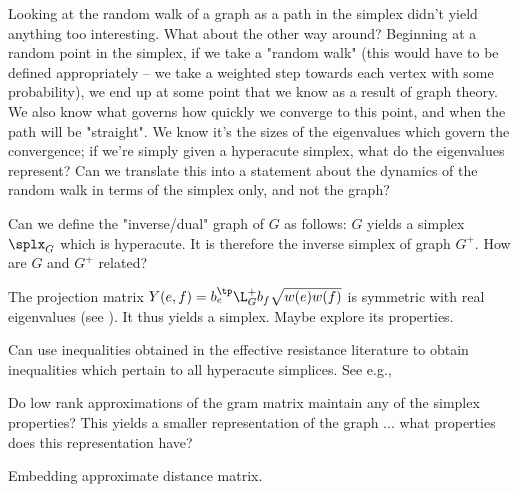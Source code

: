 	\item Looking at the random walk of a graph as a path in the simplex didn't yield anything too interesting. What about the other way around? Beginning at a random point in the simplex, if we take a "random walk" (this would have to be defined appropriately -- we take a weighted step towards each vertex with some probability), we end up at some point that we know as a result of graph theory. We also know what governs how quickly we converge to this point, and when the path will be "straight". We know it's the sizes of the eigenvalues which govern the convergence; if we're simply given a hyperacute simplex, what do the eigenvalues represent? Can we translate this into a statement about the dynamics of the random walk in terms of the simplex only, and not the graph?
\item Can we define the "inverse/dual" graph of $G$ as follows: $G$ yields a simplex $\splx_G$ which is hyperacute. It is therefore the inverse simplex of  graph $G^+$. How are $G$ and $G^+$ related? 
\item The projection matrix $Y(e,f)=b_e^\tp \L_G^+b_f\sqrt{w(e)w(f)}$ is symmetric with real eigenvalues (see \cite{vishnoi2013lx}). It thus yields a simplex. Maybe explore its properties. 
\item Can use inequalities obtained in the effective resistance literature to obtain inequalities which pertain to all hyperacute simplices. See e.g.,\cite{alev2017graph} 
\item Do low rank approximations of the gram matrix maintain any of the simplex properties? This yields a smaller representation of the graph ... what properties does this representation have?
\item Embedding approximate distance matrix. 


